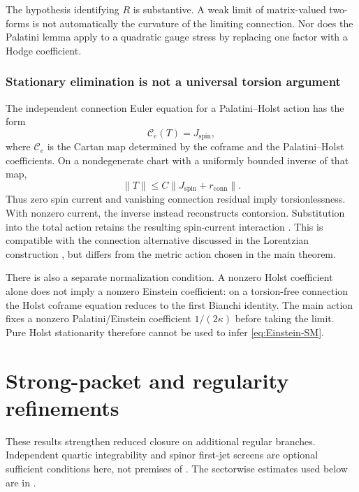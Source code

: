 \documentclass[11pt]{article}
\numberwithin{equation}{section}
\theoremstyle{definition}
\theoremstyle{remark}
\newcommand{\norm}[1]{\lVert#1\rVert}
\begin{document}
The hypothesis identifying $R$ is substantive. A weak limit of matrix-valued two-forms is not automatically the curvature of the limiting connection. Nor does the Palatini lemma apply to a quadratic gauge stress by replacing one factor with a Hodge coefficient.

\subsubsection{Stationary elimination is not a universal torsion argument}

The independent connection Euler equation for a Palatini--Holst action has the form
\begin{equation}
 \mathcal C_e(T)=J_{\mathrm{spin}},
 \label{eq:Cartan-source}
\end{equation}
where $\mathcal C_e$ is the Cartan map determined by the coframe and the Palatini--Holst coefficients. On a nondegenerate chart with a uniformly bounded inverse of that map,
\[
 \norm T\le C\norm{J_{\mathrm{spin}}+r_{\mathrm{conn}}}.
\]
Thus zero spin current and vanishing connection residual imply torsionlessness. With nonzero current, the inverse instead reconstructs contorsion. Substitution into the total action retains the resulting spin-current interaction \cite{Kibble1961,HehlEtAl1976}. This is compatible with the connection alternative discussed in the Lorentzian construction \cite{PelissierRenewalSpacetime2026}, but differs from the metric action chosen in the main theorem.

There is also a separate normalization condition. A nonzero Holst coefficient alone does not imply a nonzero Einstein coefficient: on a torsion-free connection the Holst coframe equation reduces to the first Bianchi identity. The main action fixes a nonzero Palatini/Einstein coefficient $1/(2\kappa)$ before taking the limit. Pure Holst stationarity therefore cannot be used to infer \eqref{eq:Einstein-SM}.

\section{Strong-packet and regularity refinements}
\label{app:strong-packet}

These results strengthen reduced closure on additional regular branches.
Independent quartic integrability and spinor first-jet screens are optional
sufficient conditions here, not premises of .
The sectorwise estimates used below are in
.
\end{document}
